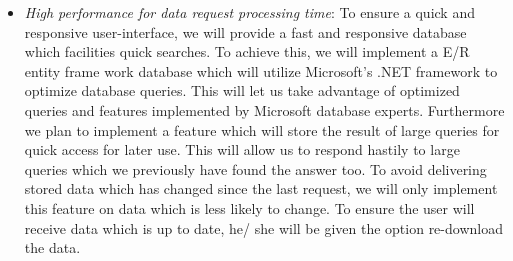 \begin{itemize}
\item \textit{High performance for data request processing time}: To ensure a quick and responsive user-interface, we will provide a fast and responsive database which facilities quick searches. To achieve this, we will implement a E/R entity frame work database which will utilize Microsoft's .NET framework to optimize database queries. This will let us take advantage of optimized queries and features implemented by Microsoft  database experts. Furthermore we plan to implement a feature which will store the result of large queries for quick access for later use. This will allow us to respond hastily to large queries which we previously have found the answer too. To avoid delivering stored data which has changed since the last request, we will only implement this feature on data which is less likely to change. To ensure the user will receive data which is up to date, he/ she will be given the option re-download the data. 
\end{itemize}
